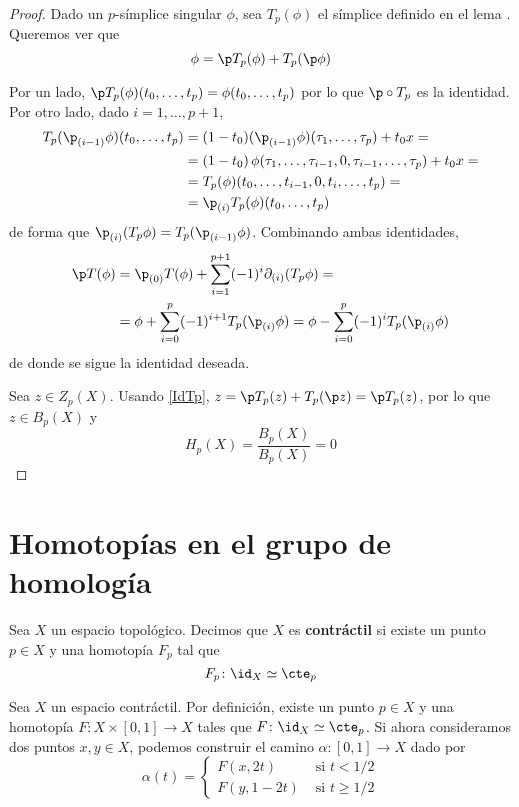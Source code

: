 \begin{proof}
Dado un $p$-símplice singular $\phi$, sea $T_p(\phi)$ el símplice definido en el
lema . Queremos ver que
\begin{equation}
\phi=\p T_p(\phi)+T_p(\p \phi) \label{IdTp}
\end{equation}

Por un lado, $\p T_p(\phi)(t_0,\dots,t_p)=\phi(t_0,\dots,t_p)$ por lo que
$\p\circ T_p$ es la identidad. Por otro lado, dado $i=1,\dots,p+1$,
\begin{align*}
T_p(\p_{(i-1)}\phi)(t_0,\dots,t_p)
	&=(1-t_0)(\p_{(i-1)}\phi)(\tau_1,\dots,\tau_p)+t_0x=\\
	&=(1-t_0)\,\phi(\tau_1,\dots,\tau_{i-1},0,\tau_{i-1},\dots,\tau_p)+t_0x=\\
	&=T_p(\phi)(t_0,\dots,t_{i-1},0,t_i,\dots,t_p)=\\
	&=\p_{(i)}T_p(\phi)(t_0,\dots,t_p)
\end{align*}
de forma que $\p_{(i)}(T_p\phi)=T_p(\p_{(i-1)}\phi)$. Combinando ambas
identidades,
\begin{align*}
\p T(\phi)
	&=\p_{(0)}T(\phi)+\sum^{p+1}_{i=1}(-1)^i\partial_{(i)}(T_p\phi)=\\
	&=\phi+\sum^p_{i=0}(-1)^{i+1}T_p(\p_{(i)}\phi)=
	\phi-\sum^p_{i=0}(-1)^iT_p(\p_{(i)}\phi)
\end{align*}
de donde se sigue la identidad deseada.

Sea $z \in Z_p(X)$. Usando \eqref{IdTp}, $z=\p T_p(z)+T_p(\p z)=\p T_p(z)$,
por lo que $z \in B_p(X)$ y
\[H_p(X)=\frac{B_p(X)}{B_p(X)}=0\]
\end{proof}

\section{Homotopías en el grupo de homología}
\begin{definition}
Sea $X$ un espacio topológico. Decimos que $X$ es \textbf{contráctil} si existe
un punto $p \in X$ y una homotopía $F_p$ tal que
\[F_p\colon \id_X \simeq \cte_p\]
\end{definition}

Sea $X$ un espacio contráctil. Por definición, existe un punto $p \in X$ y una
homotopía $F\colon X \times [0,1] \to X$ tales que $F\colon \id_X \simeq
\cte_p$. Si ahora consideramos dos puntos $x,y \in X$, podemos construir el
camino $\alpha\colon [0,1] \to X$ dado por
\[\alpha(t)=
\begin{cases}
F(x,2t) & \text{ si $t < 1/2$}\\
F(y,1-2t) & \text{ si $t \geq 1/2$}
\end{cases}\]


